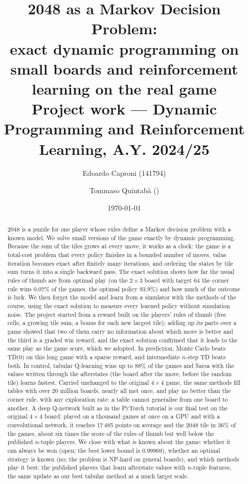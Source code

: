 \documentclass[11pt,a4paper]{article}
\title{2048 as a Markov Decision Problem:\\ exact dynamic programming on small boards and reinforcement learning on the real game\\[4pt]
\large Project work --- Dynamic Programming and Reinforcement Learning, A.Y. 2024/25}
\author{Edoardo Caproni (141794) \and Tommaso Quintab\`a (\todo{matricola})}
\date{\today}
\theoremstyle{remark}
\begin{document}
\maketitle

\begin{abstract}
2048 is a puzzle for one player whose rules define a Markov decision problem with a known model. We solve small versions of the game exactly by dynamic programming. Because the sum of the tiles grows at every move, it works as a clock: the game is a total-cost problem that every policy finishes in a bounded number of moves, value iteration becomes exact after finitely many iterations, and ordering the states by tile sum turns it into a single backward pass. The exact solution shows how far the usual rules of thumb are from optimal play (on the $2\times3$ board with target 64 the corner rule wins 0.07\% of the games, the optimal policy 93.9\%) and how much of the outcome is luck. We then forget the model and learn from a simulator with the methods of the course, using the exact solution to measure every learned policy without simulation noise. The project started from a reward built on the players' rules of thumb (free cells, a growing tile sum, a bonus for each new largest tile); adding up its parts over a game showed that two of them carry no information about which move is better and the third is a graded win reward, and the exact solution confirmed that it leads to the same play as the game score, which we adopted. In prediction, Monte Carlo beats TD(0) on this long game with a sparse reward, and intermediate $n$-step TD beats both. In control, tabular Q-learning wins up to 88\% of the games and Sarsa with the values written through the afterstates (the board after the move, before the random tile) learns fastest. Carried unchanged to the original $4\times4$ game, the same methods fill tables with over 20 million boards, nearly all met once, and play no better than the corner rule, with any exploration rate: a table cannot generalise from one board to another. A deep Q-network built as in the PyTorch tutorial is our final test on the original $4\times4$ board: played on a thousand games at once on a GPU and with a convolutional network, it reaches 17\,485 points on average and the 2048 tile in 36\% of the games, about six times the score of the rules of thumb but well below the published $n$-tuple players. We close with what is known about the game: whether it can always be won (open; the best lower bound is 0.99969), whether an optimal strategy is known (no; the problem is NP-hard on general boards), and which methods play it best: the published players that learn afterstate values with $n$-tuple features, the same update as our best tabular method at a much larger scale.
\end{abstract}
\end{document}
